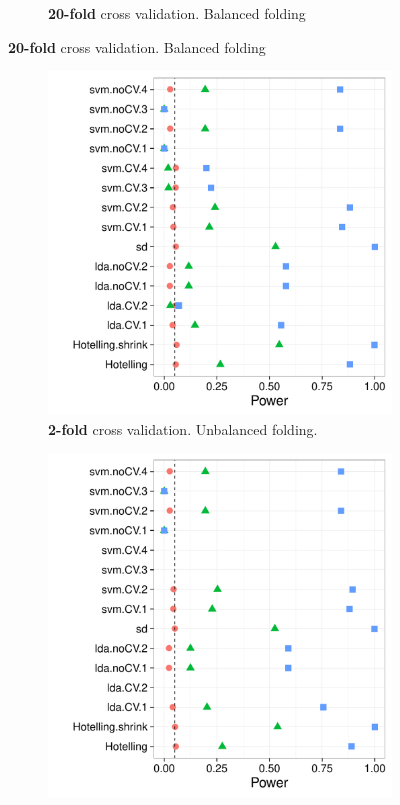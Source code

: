 \documentclass[12pt,a4paper]{article}
\theoremstyle{definition}
\newcommand{\mycaption}{Simulation details in Appendix~\ref{apx:simulation_details} except the changes in the sub-captions.}
\begin{document}
\begin{figure}[h]
\begin{subfigure}{.5\textwidth}
	  \caption{\textbf{20-fold} cross validation. Balanced folding} 
	\label{fig:n_folds_2}
	\end{subfigure}
\end{figure}



\begin{figure}[h]
\centering
\caption{\mycaption}	
\label{fig:n_folds_unbalanced}
	\begin{subfigure}{.5\textwidth}
	  \centering
	  \includegraphics[width=1\linewidth]{"art/2016-08-05 09:37:35"}
	  \caption{\textbf{2-fold} cross validation. Unbalanced folding.} 
	\label{fig:n_folds_unbalanced_1}
	\end{subfigure}%
	\begin{subfigure}{.5\textwidth}
	  \centering
	  \includegraphics[width=1\linewidth]{"art/2016-08-06 07:57:22"}

\end{subfigure}
\end{figure}
\end{document}
